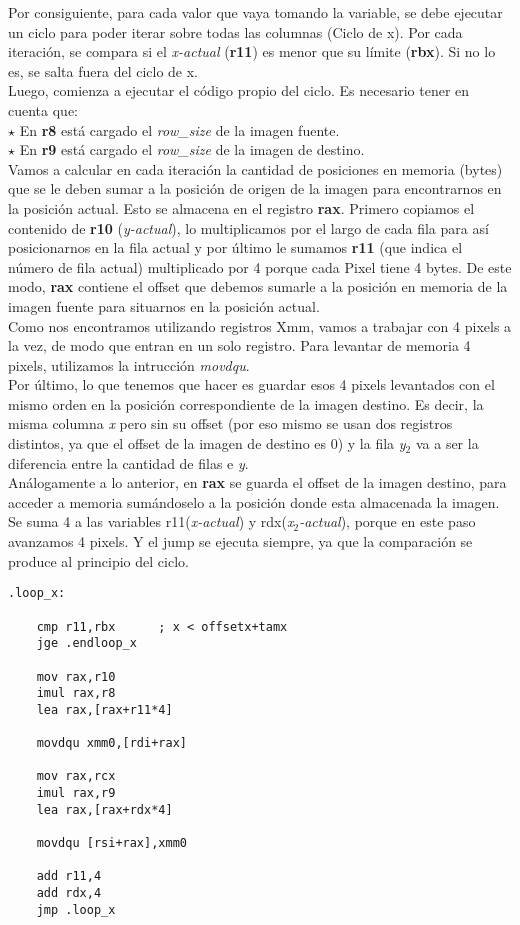 \documentclass[a4paper]{article}
\begin{document}
\indent Por consiguiente, para cada valor que vaya tomando la variable, se debe ejecutar un ciclo para poder iterar sobre todas las columnas (Ciclo de x). Por cada iteraci\'on, se compara si el \emph{x-actual} (\textbf{r11}) es menor que su l\'imite (\textbf{rbx}). Si no lo es, se salta fuera del ciclo de x. \\
\indent Luego, comienza a ejecutar el c\'odigo propio del ciclo. Es necesario tener en cuenta que: \\
$\star$ En \textbf{r8} est\'a cargado el \textit{row_size} de la imagen fuente. \\
$\star$ En \textbf{r9} est\'a cargado el \textit{row_size} de la imagen de destino. \\
\indent Vamos a calcular en cada iteraci\'on la cantidad de posiciones en memoria (bytes) que se le deben sumar a la posici\'on de origen de la imagen para encontrarnos en la posici\'on actual. Esto se almacena en el registro \textbf{rax}. Primero copiamos el contenido de \textbf{r10} (\emph{y-actual}), lo multiplicamos por el largo de cada fila para as\'i posicionarnos en la fila actual y por \'ultimo le sumamos \textbf{r11} (que indica el n\'umero de fila actual) multiplicado por 4 porque cada Pixel tiene 4 bytes. De este modo, \textbf{rax} contiene el offset que debemos sumarle a la posici\'on en memoria de la imagen fuente para situarnos en la posici\'on actual.\\
\indent Como nos encontramos utilizando registros Xmm, vamos a trabajar con 4 pixels a la vez, de modo que entran en un solo registro. Para levantar de memoria 4 pixels, utilizamos la intrucci\'on \textit{movdqu}. \\
\indent Por \'ultimo, lo que tenemos que hacer es guardar esos 4 pixels levantados con el mismo orden en la posici\'on correspondiente de la imagen destino. Es decir, la misma columna \emph{x} pero sin su offset (por eso mismo se usan dos registros distintos, ya que el offset de la imagen de destino es 0) y la fila \emph{y$_2$} va a ser la diferencia entre la cantidad de filas e \emph{y}. \\
\indent An\'alogamente a lo anterior, en \textbf{rax} se guarda el offset de la imagen destino, para acceder a memoria sum\'andoselo a la posici\'on donde esta almacenada la imagen. \\
\indent Se suma 4 a las variables r11(\emph{x-actual}) y rdx(\emph{x$_2$-actual}), porque en este paso avanzamos 4 pixels. Y el jump se ejecuta siempre, ya que la comparaci\'on se produce al principio del ciclo.
	  \begin{codesnippet}
\begin{verbatim}
.loop_x:

	cmp r11,rbx      ; x < offsetx+tamx
	jge .endloop_x

	mov rax,r10
	imul rax,r8
	lea rax,[rax+r11*4]

	movdqu xmm0,[rdi+rax]

	mov rax,rcx
	imul rax,r9
	lea rax,[rax+rdx*4]

	movdqu [rsi+rax],xmm0

	add r11,4
	add rdx,4
	jmp .loop_x	
\end{verbatim}
\end{codesnippet}
\end{document}
